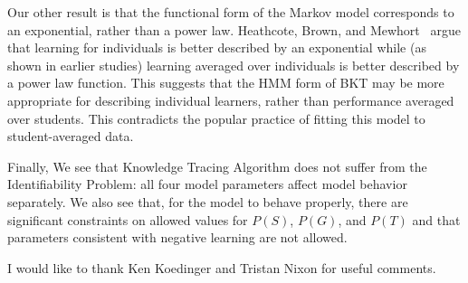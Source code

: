 \documentclass{acmlarge-edm}
\begin{document}
Our other result is that the functional form of the Markov model 
corresponds to an exponential, rather than a power law.  
Heathcote, Brown, and Mewhort~\cite{heathcote_power_2000}
argue that learning for individuals is better described by an
exponential while (as shown in earlier studies) learning averaged
over individuals is better described by a power law function.
This suggests that the HMM form of BKT may be more appropriate for describing
individual learners, rather than performance averaged over students.
This contradicts the popular practice of fitting this model to 
student-averaged data.

Finally, We see that Knowledge Tracing Algorithm does not suffer from
the Identifiability Problem:  all four model parameters
affect model behavior separately.  
We also see that, for the model to behave properly,  there are 
significant constraints on allowed values for $P(S)$, $P(G)$, and $P(T)$
and that parameters consistent with negative learning are not allowed.

\begin{acks}
I would like to thank Ken Koedinger and Tristan Nixon for
useful comments.
\end{acks}


\end{document}
